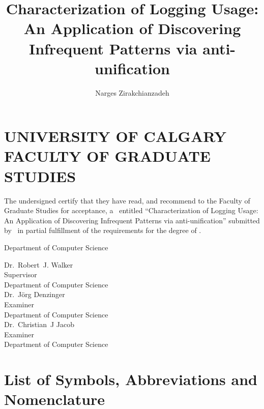 \documentclass{ucalgthes1}
\title{Characterization of Logging Usage:\\An Application of Discovering Infrequent Patterns via anti-unification}
\author{Narges Zirakchianzadeh}
\theoremstyle{plain}
\theoremstyle{definition}
\newcommand{\thestitle}{Characterization of Logging Usage: An Application of Discovering Infrequent Patterns via anti-unification}
\begin{document}
\makethesistitle
{}     %
\setcounter{page}{1}


\chapter*{UNIVERSITY OF CALGARY \\ FACULTY OF GRADUATE STUDIES}
\thispagestyle{empty}
The undersigned certify that they have read, and recommend
to the Faculty of Graduate Studies for acceptance, a \Thesis\ entitled
``\thestitle'' submitted by \Author\
in partial fulfillment of the requirements for the degree of
\Degree.\\

%
%

\begin{signing}{Department of Computer Science}

\newsigncolumn

\signline
Dr.~Robert~J. Walker \\
Supervisor \\
Department of Computer Science  \\


\signline
Dr.~J{\"o}rg Denzinger \\
Examiner \\
Department of  Computer Science \\

\signline
Dr.~Christian~J Jacob \\
Examiner \\
Department of  Computer Science \\
\end{signing}

\newpage
{}
{}


\newpage
{}
{}


\begin{singlespace}
\newpage
{}
\tableofcontents
\pagestyle{plain}
\newpage
{}
\listoftables
\pagestyle{plain}
\newpage
{}
\listoffigures
\pagestyle{plain}
\clearpage
\clearpage          %
\end{singlespace}
\newpage
{}
\chapter*{\bf{List of Symbols, Abbreviations and Nomenclature}\hfill} 
\listofsymbols
\pagestyle{plain}
\clearpage
\end{document}
